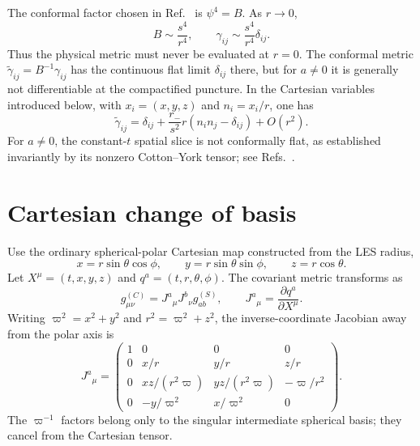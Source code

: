 \documentclass[11pt]{article}
\newcommand{\vpi}{\varpi}
\begin{document}
The conformal factor chosen in Ref.~\cite{Assumpcao2024} is $\psi^4=B$. As $r\to0$,
\begin{equation}
 B\sim\frac{s^4}{r^4},\qquad
 \gamma_{ij}\sim\frac{s^4}{r^4}\delta_{ij}. \label{eq:puncturebehavior}
\end{equation}
Thus the physical metric must never be evaluated at $r=0$. The conformal metric $\widetilde\gamma_{ij}=B^{-1}\gamma_{ij}$ has the continuous flat limit $\delta_{ij}$ there, but for $a\neq0$ it is generally not differentiable at the compactified puncture. In the Cartesian variables introduced below, with $x_i=(x,y,z)$ and $n_i=x_i/r$, one has
\begin{equation}
 \widetilde\gamma_{ij}
 =\delta_{ij}+\frac{r_-}{s^2}r\left(n_i n_j-\delta_{ij}\right)
 +O(r^2). \label{eq:conformalpuncture}
\end{equation}
For $a\neq0$, the constant-$t$ spatial slice is not conformally flat, as established invariantly by its nonzero Cotton--York tensor; see Refs.~\cite{GaratPrice2000,ValienteKroon2004}.

\section{Cartesian change of basis}

Use the ordinary spherical-polar Cartesian map constructed from the LES radius,
\begin{equation}
 x=r\sin\theta\cos\phi,\qquad
 y=r\sin\theta\sin\phi,\qquad
 z=r\cos\theta. \label{eq:cartmap}
\end{equation}
Let $X^\mu=(t,x,y,z)$ and $q^a=(t,r,\theta,\phi)$. The covariant metric transforms as
\begin{equation}
 g^{(C)}_{\mu\nu}=J^a{}_{\mu}J^b{}_{\nu}g^{(S)}_{ab},
 \qquad
 J^a{}_{\mu}=\frac{\partial q^a}{\partial X^\mu}. \label{eq:basistransform}
\end{equation}
Writing $\vpi^2=x^2+y^2$ and $r^2=\vpi^2+z^2$, the inverse-coordinate Jacobian away from the polar axis is
\begin{equation}
 J^a{}_{\mu}=
 \begin{pmatrix}
 1&0&0&0\\
 0&x/r&y/r&z/r\\
 0&xz/(r^2\vpi)&yz/(r^2\vpi)&-\vpi/r^2\\
 0&-y/\vpi^2&x/\vpi^2&0
 \end{pmatrix}. \label{eq:jacobian}
\end{equation}
The $\vpi^{-1}$ factors belong only to the singular intermediate spherical basis; they cancel from the Cartesian tensor.
\end{document}
